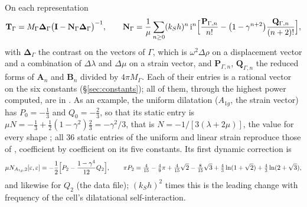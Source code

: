 \documentclass[11pt,a4paper]{article}
\newcommand{\bN}{\mathbf{N}}
\newcommand{\bT}{\mathbf{T}}
\newcommand{\bI}{\mathbf{I}}
\newcommand{\bD}{\boldsymbol{\Delta}}
\begin{document}
On each representation
\begin{equation}\label{eq:tgamma}
  \bT_\Gamma=M_\Gamma\bD_\Gamma\bigl(\bI-\bN_\Gamma\bD_\Gamma\bigr)^{-1},\qquad
  \bN_\Gamma=\frac1\mu\sum_{n\ge0}(k_Sh)^n\,\mathrm i^n\Bigl[\frac{\mathbf P_{\Gamma,n}}{n!}
  -\bigl(1-\gamma^{n+2}\bigr)\frac{\mathbf Q_{\Gamma,n}}{(n+2)!}\Bigr],
\end{equation}
with $\bD_\Gamma$ the contrast on the vectors of $\Gamma$, which is $\omega^2\Delta\rho$ on a displacement
vector and a combination of $\Delta\lambda$ and $\Delta\mu$ on a strain vector, and $\mathbf P_{\Gamma,n}$,
$\mathbf Q_{\Gamma,n}$ the reduced forms of $\mathbf A_n$ and $\mathbf B_n$ divided by $4\pi M_\Gamma$. Each
of their entries is a rational vector on the six constants (\S\ref{sec:constants}); all of them, through
the highest power computed, are in . As an example, the uniform
dilatation ($A_{1g}$, the strain vector) has $P_{0}=-\tfrac13$ and $Q_{0}=-\tfrac23$, so that its static
entry is $\mu N=-\tfrac13+\tfrac12(1-\gamma^2)\tfrac23=-\gamma^2/3$, that is
$N=-1/[3(\lambda+2\mu)]$, the value for every shape \citep{NestorCoupling2026}; all $36$ static entries
of the uniform and linear strain reproduce those of \citet{NestorCoupling2026}, coefficient by coefficient
on its five constants. Its first
dynamic correction is
\begin{equation}\label{eq:a1gdyn}
  \mu N_{A_{1g},2}[\varepsilon,\varepsilon]=-\frac{1}{2}\Bigl[P_2-\frac{1-\gamma^4}{12}Q_2\Bigr],\qquad
  \pi P_2=\tfrac4{15}-\tfrac49\pi+\tfrac4{15}\sqrt2-\tfrac8{15}\sqrt3+\tfrac43\ln(1+\sqrt2)
  +\tfrac43\ln(2+\sqrt3),
\end{equation}
and likewise for $Q_2$ (the data file); $(k_Sh)^2$ times this is the leading change with frequency of
the cell's dilatational self-interaction.
\end{document}
